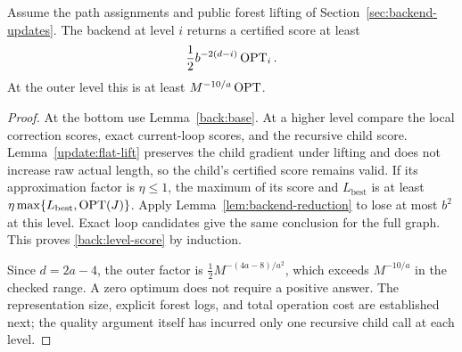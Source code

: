 \begin{corollary}
\label{back:quality-induction}
Assume the path assignments and public forest lifting of
Section~\ref{sec:backend-updates}.  The backend at level $i$ returns
a certified score at least
\begin{equation}
\label{back:level-score}
                    \frac12 b^{-2(d-i)}\operatorname{OPT}_i.
\end{equation}
At the outer level this is at least $M^{-10/a}\operatorname{OPT}$.
\end{corollary}

\begin{proof}
At the bottom use Lemma~\ref{back:base}.  At a higher level compare
the local correction scores, exact current-loop scores, and the
recursive child score.  Lemma~\ref{update:flat-lift} preserves the
child gradient under lifting and does not increase raw actual length,
so the child's certified score remains valid.  If its approximation
factor is $\eta\le1$, the maximum of its score and
$L_{\mathrm{best}}$ is at least
$\eta\max\{L_{\mathrm{best}},\operatorname{OPT}(J)\}$.  Apply
Lemma~\ref{lem:backend-reduction} to lose at most $b^2$ at this
level.  Exact loop candidates give the same conclusion for the full
graph.  This proves \eqref{back:level-score} by induction.

Since $d=2a-4$, the outer factor is
$\tfrac12M^{-(4a-8)/a^2}$, which exceeds $M^{-10/a}$ in the checked
range.  A zero optimum does not require a positive answer.  The
representation size, explicit forest logs, and total operation cost
are established next; the quality argument itself has incurred only
one recursive child call at each level.
\end{proof}
